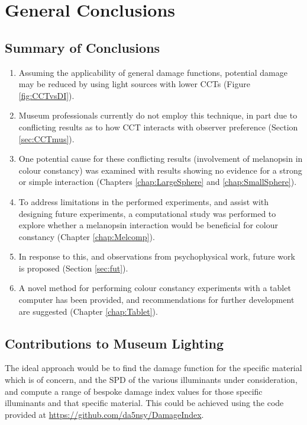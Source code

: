 \chapter{General Conclusions}
\label{chap:Conclusions}

\section{Summary of Conclusions}

\begin{enumerate}
\item Assuming the applicability of general damage functions, potential damage may be reduced by using light sources with lower \glspl{CCT} (Figure \ref{fig:CCTvsDI}).
\item Museum professionals currently do not employ this technique, in part due to conflicting results as to how \gls{CCT} interacts with observer preference (Section \ref{sec:CCTmus}).
\item One potential cause for these conflicting results (involvement of melanopsin in colour constancy) was examined with results showing no evidence for a strong or simple interaction (Chapters \ref{chap:LargeSphere} and \ref{chap:SmallSphere}).
\item To address limitations in the performed experiments, and assist with designing future experiments, a computational study was performed to explore whether a melanopsin interaction would be beneficial for colour constancy (Chapter \ref{chap:Melcomp}).
\item In response to this, and observations from psychophysical work, future work is proposed (Section \ref{sec:fut}).
\item A novel method for performing colour constancy experiments with a tablet computer has been provided, and recommendations for further development are suggested (Chapter \ref{chap:Tablet}).
\end{enumerate}

\section{Contributions to Museum Lighting}

The ideal approach would be to find the damage function for the specific material which is of concern, and the \gls{SPD} of the various illuminants under consideration, and compute a range of bespoke damage index values for those specific illuminants and that specific material. This could be achieved using the code provided at \url{https://github.com/da5nsy/DamageIndex}.

